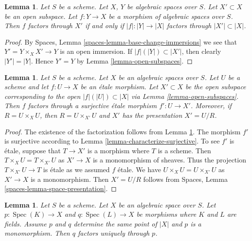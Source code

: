 \documentclass{stacks-project}
\theoremstyle{plain}
\newtheorem{lemma}[subsection]{Lemma}
\theoremstyle{definition}
\theoremstyle{remark}
\numberwithin{equation}{subsection}
\def\Spec{\mathop{\mathrm{Spec}}}
\begin{document}
\begin{lemma}
\label{lemma-factor-through-open-subspace}
Let $S$ be a scheme.
Let $X$, $Y$ be algebraic spaces over $S$.
Let $X' \subset X$ be an open subspace.
Let $f : Y \to X$ be a morphism of algebraic spaces over $S$.
Then $f$ factors through $X'$ if and only if $|f| : |Y| \to |X|$
factors through $|X'| \subset |X|$.
\end{lemma}

\begin{proof}
By Spaces, Lemma \ref{spaces-lemma-base-change-immersions}
we see that $Y' = Y \times_X X' \to Y$ is an open immersion.
If $|f|(|Y|) \subset |X'|$, then clearly $|Y'| = |Y|$. Hence $Y' = Y$ by
Lemma \ref{lemma-open-subspaces}.
\end{proof}

\begin{lemma}
\label{lemma-etale-image-open}
Let $S$ be a scheme. Let $X$ be an algebraic spaces over $S$.
Let $U$ be a scheme and let $f : U \to X$ be an \'etale morphism.
Let $X' \subset X$ be the open subspace corresponding to
the open $|f|(|U|) \subset |X|$ via
Lemma \ref{lemma-open-subspaces}.
Then $f$ factors through a surjective \'etale morphism $f' : U \to X'$.
Moreover, if $R = U \times_X U$, then $R = U \times_{X'} U$ and $X'$ has
the presentation $X' = U/R$.
\end{lemma}

\begin{proof}
The existence of the factorization follows from
Lemma \ref{lemma-factor-through-open-subspace}.
The morphism $f'$ is surjective according to
Lemma \ref{lemma-characterize-surjective}.
To see $f'$ is \'etale, suppose that $T \to X'$ is a morphism
where $T$ is a scheme. Then $T \times_X U = T \times_{X'} U$
as $X' \to X$ is a monomorphism of sheaves. Thus the projection
$T \times_{X'} U \to T$ is \'etale as we assumed $f$ \'etale.
We have $U \times_X U = U \times_{X'} U$ as $X' \to X$ is a monomorphism.
Then $X' = U/R$ follows from
Spaces, Lemma \ref{spaces-lemma-space-presentation}.
\end{proof}

\begin{lemma}
\label{lemma-equivalence-class-point-monomorphism}
Let $S$ be a scheme. Let $X$ be an algebraic space over $S$.
Let $p : \Spec(K) \to X$ and $q : \Spec(L) \to X$
be morphisms where $K$ and $L$ are fields. Assume $p$ and $q$
determine the same point of $|X|$ and $p$ is a monomorphism.
Then $q$ factors uniquely through $p$.
\end{lemma}
\end{document}
